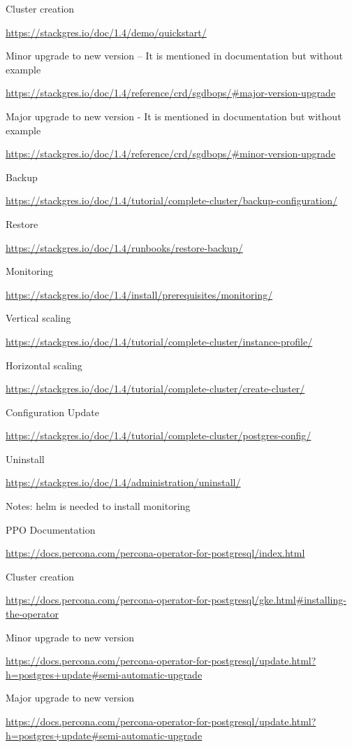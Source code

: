 Cluster creation

\url{https://stackgres.io/doc/1.4/demo/quickstart/}

Minor upgrade to new version – It is mentioned in documentation but without example

\url{https://stackgres.io/doc/1.4/reference/crd/sgdbops/#major-version-upgrade}

Major upgrade to new version - It is mentioned in documentation but without example

\url{https://stackgres.io/doc/1.4/reference/crd/sgdbops/#minor-version-upgrade}

Backup

\url{https://stackgres.io/doc/1.4/tutorial/complete-cluster/backup-configuration/}

Restore

\url{https://stackgres.io/doc/1.4/runbooks/restore-backup/}

Monitoring

\url{https://stackgres.io/doc/1.4/install/prerequisites/monitoring/}

Vertical scaling

\url{https://stackgres.io/doc/1.4/tutorial/complete-cluster/instance-profile/}

Horizontal scaling

\url{https://stackgres.io/doc/1.4/tutorial/complete-cluster/create-cluster/}

Configuration Update

\url{https://stackgres.io/doc/1.4/tutorial/complete-cluster/postgres-config/}

Uninstall

\url{https://stackgres.io/doc/1.4/administration/uninstall/}

Notes: helm is needed to install monitoring

PPO
Documentation

\url{https://docs.percona.com/percona-operator-for-postgresql/index.html}

Cluster creation

\url{https://docs.percona.com/percona-operator-for-postgresql/gke.html#installing-the-operator}

Minor upgrade to new version

\url{https://docs.percona.com/percona-operator-for-postgresql/update.html?h=postgres+update#semi-automatic-upgrade}

Major upgrade to new version

\url{https://docs.percona.com/percona-operator-for-postgresql/update.html?h=postgres+update#semi-automatic-upgrade}

